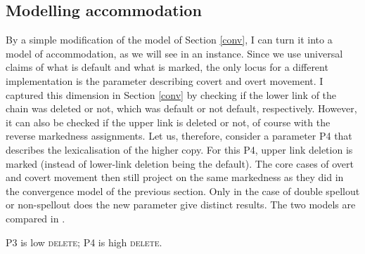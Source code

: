 \documentclass[output=paper,hidelinks,draftmode]{langscibook}
\begin{document}
\subsection{Modelling accommodation}\label{accom}



By a simple modification of the model of Section \ref{conv}, I can turn it into a model of accommodation, as we will see in an instance. Since we use universal claims of what is default and what is marked, the only locus for a different implementation is the parameter describing covert and overt movement. I captured this dimension in Section \ref{conv} by checking if the lower link of the chain was deleted or not, which was default or not default, respectively. However, it can also be checked if the upper link is deleted or not, of course with the reverse markedness assignments. Let us, therefore, consider a parameter P4 that describes the lexicalisation of the higher copy. For this P4, upper link deletion is marked (instead of lower-link deletion being the default). The core cases of overt and covert movement then still project on the same markedness as they did in the convergence model of the previous section. Only in the case of double spellout or non-spellout does the new parameter give distinct results. The two models are compared in .


\begin{table}[h]
\caption{Chain reduction: low/high \textsc{delete} as ruling parameters and their respective markedness.}
P3 is low \textsc{delete}; P4 is high \textsc{delete}.
\label{tab:postma:7}
\end{table}
\end{document}
